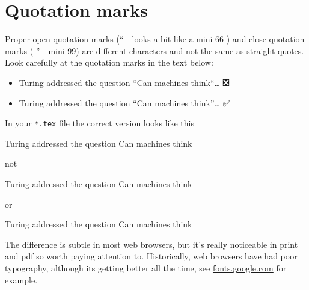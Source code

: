 \documentclass[
]{book}
\newenvironment{Shaded}{\begin{snugshade}}{\end{snugshade}}
\newcommand{\NormalTok}[1]{#1}
\providecommand{\tightlist}{%
  \setlength{\itemsep}{0pt}\setlength{\parskip}{0pt}}
\begin{document}
\hypertarget{quotation-marks}{%
\section{Quotation marks}\label{quotation-marks}}

Proper open quotation marks (`` - looks a bit like a mini 66 ) and close quotation marks ( '' - mini 99) are different characters and not the same as straight quotes. Look carefully at the quotation marks in the text below:

\begin{itemize}
\tightlist
\item
  Turing addressed the question ``Can machines think``\ldots{} ❎
\item
  Turing addressed the question ``Can machines think''\ldots{} ✅
\end{itemize}

In your \texttt{*.tex} file the correct version looks like this

\begin{Shaded}
\begin{Highlighting}[]
\NormalTok{Turing addressed the question \textasciigrave{}\textasciigrave{}Can machines think\textquotesingle{}\textquotesingle{}}
\end{Highlighting}
\end{Shaded}

not

\begin{Shaded}
\begin{Highlighting}[]
\NormalTok{Turing addressed the question \textasciigrave{}\textasciigrave{}Can machines think\textasciigrave{}\textasciigrave{}}
\end{Highlighting}
\end{Shaded}

or

\begin{Shaded}
\begin{Highlighting}[]
\NormalTok{Turing addressed the question \textquotesingle{}\textquotesingle{}Can machines think\textquotesingle{}\textquotesingle{}}
\end{Highlighting}
\end{Shaded}

The difference is subtle in most web browsers, but it's really noticeable in print and pdf so worth paying attention to. Historically, web browsers have had poor typography, although its getting better all the time, see \href{https://fonts.google.com/}{fonts.google.com} for example.
\end{document}
